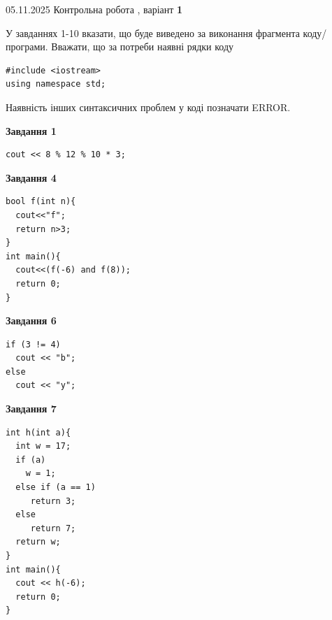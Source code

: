 \documentclass[12pt, ukrainian]{article}
\begin{document}
{\Large{05.11.2025 Контрольна робота , варіант  \No \textbf { 1 }\par}}
{
\begin {large}
У завданнях 1-10 вказати, що буде виведено за виконання фрагмента коду/про\-гра\-ми.
Вважати, що за потреби наявні рядки коду
\begin{verbatim}
#include <iostream>
using namespace std;
\end{verbatim}
Наявність інших синтаксичних проблем у коді позначати ERROR.

\begin{minipage}[t]{7.0cm}

\begin{center}
\textbf{Завдання 1}
\end{center}
\vspace{-8mm}

\begin{verbatim}
cout << 8 % 12 % 10 * 3;
\end{verbatim}



\begin{center}
\textbf{Завдання 4}
\end{center}
\vspace{-8mm}

\begin{verbatim}
bool f(int n){
  cout<<"f";
  return n>3;
}
int main(){
  cout<<(f(-6) and f(8));
  return 0;
}
\end{verbatim}



\begin{center}
\textbf{Завдання 6}
\end{center}
\vspace{-8mm}

\begin{verbatim}
if (3 != 4)
  cout << "b";
else
  cout << "y";
\end{verbatim}



\begin{center}
\textbf{Завдання 7}
\end{center}
\vspace{-8mm}

\begin{verbatim}
int h(int a){
  int w = 17;
  if (a)
    w = 1;
  else if (a == 1)
     return 3;
  else
     return 7;
  return w;
}
int main(){
  cout << h(-6);
  return 0;
}
\end{verbatim}


\end{minipage}
\end{large}}
\end{document}
